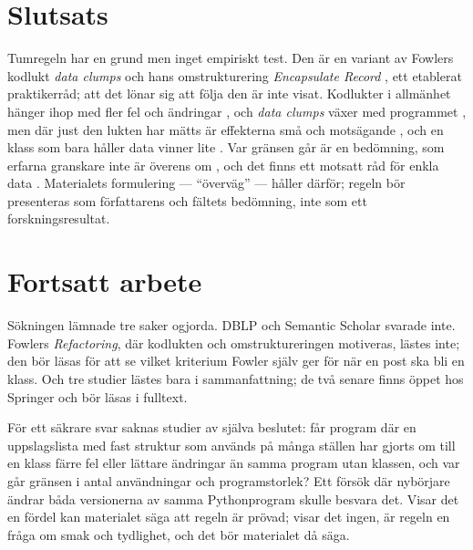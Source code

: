 \section{Slutsats}
\label{sec:tum-slutsats}

Tumregeln har en grund men inget empiriskt test.  Den är en variant av
Fowlers kodlukt \emph{data clumps} och hans omstrukturering
\emph{Encapsulate Record}
\autocite{Fowler2006DataClump,Fowler2018EncapsulateRecord}, ett etablerat
praktikerråd; att det lönar sig att följa den är inte visat.  Kodlukter
i allmänhet hänger ihop med fler fel och ändringar
\autocite{Palomba2018Smells}, och \emph{data clumps} växer med
programmet \autocite{Baumgartner2025DataClumps}, men där just den
lukten har mätts är effekterna små och motsägande
\autocite{Hall2014Smells,Soh2016Smells,Pengo2021Primitive}, och en
klass som bara håller data vinner lite
\autocite{Fontana2016FalsePositives}.  Var
gränsen går är en bedömning, som erfarna granskare inte är överens om
\autocite{Hall2014Smells}, och det finns ett motsatt råd för enkla data
\autocite{Martin2008CleanCode}.  Materialets formulering ---
\enquote{överväg} --- håller därför; regeln bör presenteras som
författarens och fältets bedömning, inte som ett forskningsresultat.

\section{Fortsatt arbete}
\label{sec:tum-fortsatt}

Sökningen lämnade tre saker ogjorda.  DBLP och Semantic Scholar svarade
inte.  Fowlers \emph{Refactoring}, där kodlukten och omstruktureringen
motiveras, lästes inte; den bör läsas för att se vilket kriterium
Fowler själv ger för när en post ska bli en klass.  Och tre studier lästes bara i
sammanfattning\autocite{Pengo2021Primitive,Palomba2018Smells,Baumgartner2025DataClumps};
de två senare finns öppet hos Springer och bör läsas i fulltext.

För ett säkrare svar saknas studier av själva beslutet: får program där
en uppslagslista med fast struktur som används på många ställen har
gjorts om till en klass färre fel eller lättare ändringar än samma
program utan klassen, och var går gränsen i antal användningar och
programstorlek?  Ett försök där nybörjare ändrar båda versionerna av
samma Pythonprogram skulle besvara det.  Visar det en fördel kan
materialet säga att regeln är prövad; visar det ingen, är regeln en
fråga om smak och tydlighet, och det bör materialet då säga.

